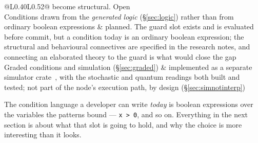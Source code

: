 \begin{center}
\begin{tabular}{@{}L{0.40\textwidth}L{0.52\textwidth}@{}}
become structural. Open \\[3pt]
Conditions drawn from the \emph{generated logic} (\S\ref{sec:logic}) rather than
from ordinary boolean expressions &
planned. The guard slot exists and is evaluated before commit, but a condition
today is an ordinary boolean expression; the structural and behavioural
connectives are specified in the research notes, and connecting an elaborated
theory to the guard is what would close the gap \\[3pt]
Graded conditions and simulation (\S\ref{sec:graded}) &
implemented as a separate simulator crate~\cite{WeightedGSLT}, with the
stochastic and quantum readings both built and tested; not part of the node's execution path, by
design (\S\ref{sec:simnotinterp}) \\
\bottomrule
\end{tabular}
\end{center}

The condition language a developer can write \emph{today} is boolean expressions
over the variables the patterns bound --- \texttt{x > 0}, and so on. Everything
in the next section is about what that slot is going to hold, and why the choice
is more interesting than it looks.
